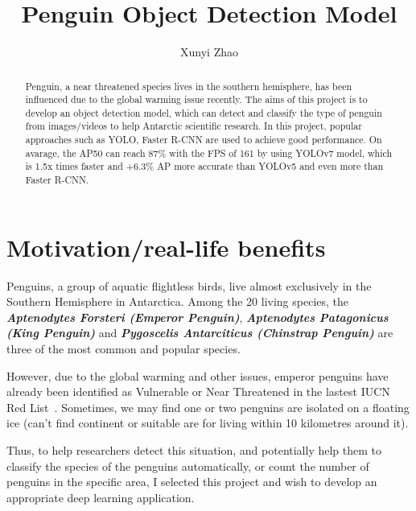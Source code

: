 \documentclass[runningheads]{llncs}
\begin{document}
%
\title{Penguin Object Detection Model}

\author{Xunyi Zhao}
%
\maketitle
%
\begin{abstract}
Penguin, a near threatened species lives in the southern hemisphere, has been influenced due to the global warming issue recently. The aims of this project is to develop an object detection model, which can  detect and classify the type of penguin from images/videos to help Antarctic scientific research. In this project, popular approaches such as YOLO, Faster R-CNN are used to achieve good performance. On avarage, the AP50 can reach 87\% with the FPS of 161 by using YOLOv7 model, which is 1.5x times faster and +6.3\% AP more accurate than YOLOv5 and even more than Faster R-CNN.

\end{abstract}
%
%

\section{Motivation/real-life benefits}
Penguins, a group of aquatic flightless birds, live almost exclusively in the Southern Hemisphere in Antarctica. Among the 20 living species, the \textbf{\textit{Aptenodytes Forsteri (Emperor Penguin)}}, \textbf{\textit{Aptenodytes Patagonicus (King Penguin)}} and \textbf{\textit{Pygoscelis Antarciticus (Chinstrap Penguin)}} are three of the most common and popular species. 

However, due to the global warming and other issues, emperor penguins have already been identified as Vulnerable or Near Threatened in the lastest IUCN Red List~\cite{ref_red_list}. Sometimes, we may find one or two penguins are isolated on a floating ice (can't find continent or suitable are for living within 10 kilometres around it).

Thus, to help researchers detect this situation, and potentially help them to classify the species of the penguins automatically, or count the number of penguins in the specific area, I selected this project and wish to develop an appropriate deep learning application.
\end{document}
